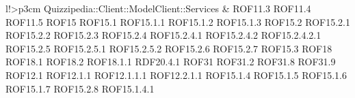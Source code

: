 \begin{tabella}{l!{\VRule}>{\centering\arraybackslash}p{3cm}}
Quizzipedia::Client::ModelClient::Services & ROF11.3 \linebreak ROF11.4 \linebreak ROF11.5 \linebreak ROF15 \linebreak ROF15.1 \linebreak ROF15.1.1 \linebreak ROF15.1.2 \linebreak ROF15.1.3 \linebreak ROF15.2 \linebreak ROF15.2.1 \linebreak ROF15.2.2 \linebreak ROF15.2.3 \linebreak ROF15.2.4 \linebreak ROF15.2.4.1 \linebreak ROF15.2.4.2 \linebreak ROF15.2.4.2.1 \linebreak ROF15.2.5 \linebreak ROF15.2.5.1 \linebreak ROF15.2.5.2 \linebreak ROF15.2.6 \linebreak ROF15.2.7 \linebreak ROF15.3 \linebreak ROF18 \linebreak ROF18.1 \linebreak ROF18.2 \linebreak ROF18.1.1 \linebreak RDF20.4.1 \linebreak ROF31 \linebreak ROF31.2 \linebreak ROF31.8 \linebreak ROF31.9 \linebreak ROF12.1 \linebreak ROF12.1.1 \linebreak ROF12.1.1.1 \linebreak ROF12.2.1.1 \linebreak ROF15.1.4 \linebreak ROF15.1.5 \linebreak ROF15.1.6 \linebreak ROF15.1.7 \linebreak ROF15.2.8 \linebreak ROF15.1.4.1 \\

\end{tabella}
